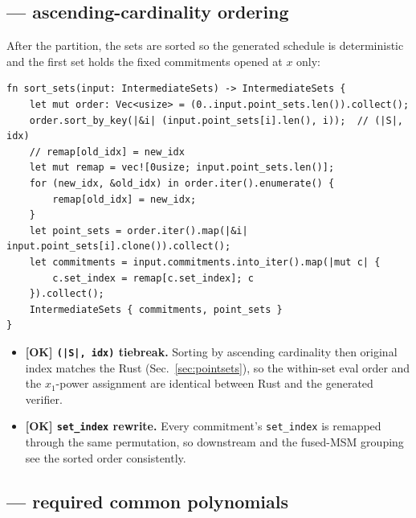 \subsection{ --- ascending-cardinality ordering}
\label{sec:sort-sets}

After the partition, the sets are sorted so the generated schedule is
deterministic and the first set holds the fixed commitments opened at
$x$ only:
\begin{lstlisting}[style=rust]
fn sort_sets(input: IntermediateSets) -> IntermediateSets {
    let mut order: Vec<usize> = (0..input.point_sets.len()).collect();
    order.sort_by_key(|&i| (input.point_sets[i].len(), i));  // (|S|, idx)
    // remap[old_idx] = new_idx
    let mut remap = vec![0usize; input.point_sets.len()];
    for (new_idx, &old_idx) in order.iter().enumerate() {
        remap[old_idx] = new_idx;
    }
    let point_sets = order.iter().map(|&i| input.point_sets[i].clone()).collect();
    let commitments = input.commitments.into_iter().map(|mut c| {
        c.set_index = remap[c.set_index]; c
    }).collect();
    IntermediateSets { commitments, point_sets }
}
\end{lstlisting}
\begin{itemize}
  \item \textcolor{tracegreen}{\textbf{[OK] \texttt{(|S|, idx)} tiebreak.}}
        Sorting by ascending cardinality then original index matches the
        Rust  (Sec.~\ref{sec:pointsets}),
        so the within-set eval order and the $x_1$-power assignment are
        identical between Rust and the generated verifier.
  \item \textcolor{tracegreen}{\textbf{[OK] \texttt{set\_index} rewrite.}}
        Every commitment's \texttt{set\_index} is remapped through the
        same permutation, so downstream  and the
        fused-MSM grouping see the sorted order consistently.
\end{itemize}

\subsection{ --- required common polynomials}
\label{sec:used-lagrange}

